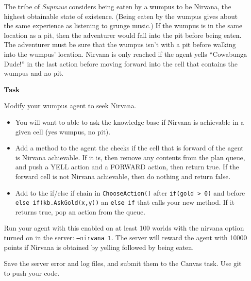 \begin{problem}{25}

  The tribe of \emph{Supmuw} considers being eaten by a wumpus to be Nirvana,
  the highest obtainable state of existence.  (Being eaten by the wumpus gives
  about the same experience as listening to grunge music.)
  If the wumpus is in the same location as a pit, then the adventurer would
  fall into the pit before being eaten.
  The adventurer must be sure that the wumpus isn't with a pit before walking
  into the wumpus' location.  Nirvana is only reached if the agent
  yells ``Cowabunga Dude!'' in the last action before moving forward into the
  cell that contains the wumpus and no pit.
  
  \vspace{.1in}
  \textbf{Task}

  Modify your wumpus agent to seek Nirvana.

  \begin{itemize}
    \item You will want to able to ask the knowledge base if Nirvana is 
      achievable in a given cell
      (yes wumpus, no pit).
    \item Add a method to the agent the checks if the cell that
      is forward of the agent is Nirvana achievable.  If it is,
      then remove any contents from the plan queue, and push
      a YELL action and a FORWARD action, then return true.
      If the forward cell is not Nirvana achievable, then
      do nothing and return false.
    \item Add to the if/else if chain in \texttt{ChooseAction()}
      after \texttt{if(gold > 0)} and before \texttt{else if(kb.AskGold(x,y))}
      an \texttt{else if} that calls your new method.  If it returns true,
      pop an action from the queue.
  \end{itemize}

  Run your agent with this enabled on at least 100 worlds with the nirvana option
  turned on in the server: \texttt{--nirvana 1}.  The server will reward the
  agent with 10000 points if Nirvana is obtained by yelling followed by being
  eaten.

  Save the server error and log files, and submit them to the Canvas task.
  Use git to push your code.

\end{problem}


